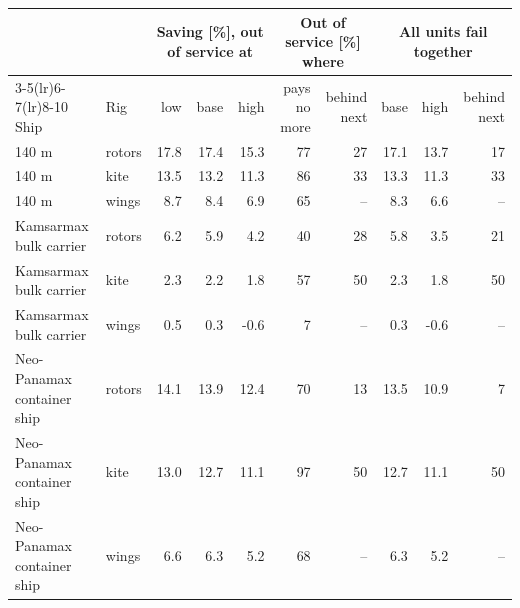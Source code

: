 \begin{tabular}{@{}llrrrrrrrr@{}}
\toprule
 & & \multicolumn{3}{c}{Saving [\%], out of service at} & \multicolumn{2}{c}{Out of service [\%] where} & \multicolumn{3}{c}{All units fail together} \\
\cmidrule(lr){3-5}\cmidrule(lr){6-7}\cmidrule(lr){8-10}
Ship & Rig & low & base & high & pays no more & behind next & base & high & behind next \\
\midrule
140 m & rotors & 17.8 & 17.4 & 15.3 & 77 & 27 & 17.1 & 13.7 & 17 \\
140 m & kite & 13.5 & 13.2 & 11.3 & 86 & 33 & 13.3 & 11.3 & 33 \\
140 m & wings & 8.7 & 8.4 & 6.9 & 65 & -- & 8.3 & 6.6 & -- \\
Kamsarmax bulk carrier & rotors & 6.2 & 5.9 & 4.2 & 40 & 28 & 5.8 & 3.5 & 21 \\
Kamsarmax bulk carrier & kite & 2.3 & 2.2 & 1.8 & 57 & 50 & 2.3 & 1.8 & 50 \\
Kamsarmax bulk carrier & wings & 0.5 & 0.3 & -0.6 & 7 & -- & 0.3 & -0.6 & -- \\
Neo-Panamax container ship & rotors & 14.1 & 13.9 & 12.4 & 70 & 13 & 13.5 & 10.9 & 7 \\
Neo-Panamax container ship & kite & 13.0 & 12.7 & 11.1 & 97 & 50 & 12.7 & 11.1 & 50 \\
Neo-Panamax container ship & wings & 6.6 & 6.3 & 5.2 & 68 & -- & 6.3 & 5.2 & -- \\
\bottomrule
\end{tabular}
